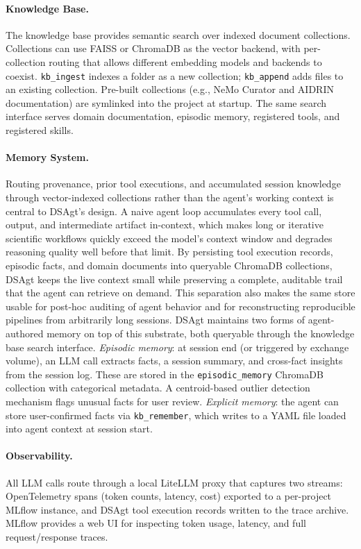 \documentclass[11pt]{article}
\begin{document}
\paragraph{Knowledge Base.}
The knowledge base provides semantic search over indexed
document collections.
Collections can use FAISS or ChromaDB as the vector backend,
with per-collection routing that allows different embedding
models and backends to coexist.
\texttt{kb\_ingest} indexes a folder as a new collection;
\texttt{kb\_append} adds files to an existing collection.
Pre-built collections (e.g., NeMo Curator and AIDRIN
documentation) are symlinked into the project at startup.
The same search interface serves domain documentation,
episodic memory, registered tools, and registered skills.

\paragraph{Memory System.}
Routing provenance, prior tool executions, and accumulated
session knowledge through vector-indexed collections rather
than the agent's working context is central to DSAgt's
design.
A naive agent loop accumulates every tool call, output, and
intermediate artifact in-context, which makes long or
iterative scientific workflows quickly exceed the model's
context window and degrades reasoning quality well before
that limit.
By persisting tool execution records, episodic facts, and
domain documents into queryable ChromaDB collections, DSAgt
keeps the live context small while preserving a complete,
auditable trail that the agent can retrieve on demand.
This separation also makes the same store usable for
post-hoc auditing of agent behavior and for reconstructing
reproducible pipelines from arbitrarily long sessions.
DSAgt maintains two forms of agent-authored memory on top of
this substrate, both queryable through the knowledge base
search interface.
\emph{Episodic memory}: at session end (or triggered by
exchange volume), an LLM call extracts facts, a session
summary, and cross-fact insights from the session log.
These are stored in the \texttt{episodic\_memory} ChromaDB
collection with categorical metadata.
A centroid-based outlier detection mechanism flags unusual
facts for user review.
\emph{Explicit memory}: the agent can store user-confirmed
facts via \texttt{kb\_remember}, which writes to a YAML file
loaded into agent context at session start.

\paragraph{Observability.}
All LLM calls route through a local LiteLLM proxy that
captures two streams: OpenTelemetry spans (token counts,
latency, cost) exported to a per-project MLflow instance, and
DSAgt tool execution records written to the trace archive.
MLflow provides a web UI for inspecting token usage, latency,
and full request/response traces.
\end{document}
